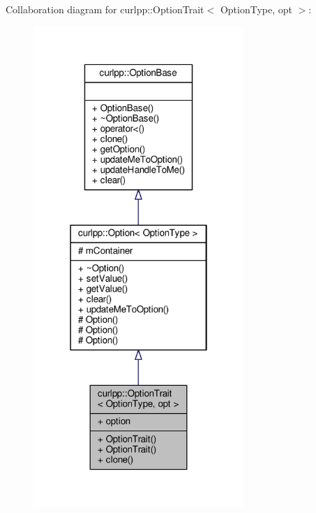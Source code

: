 Collaboration diagram for curlpp\-:\-:Option\-Trait$<$ Option\-Type, opt $>$\-:
\nopagebreak
\begin{figure}[H]
\begin{center}
\leavevmode
\includegraphics[width=226pt]{classcurlpp_1_1OptionTrait__coll__graph}
\end{center}
\end{figure}
